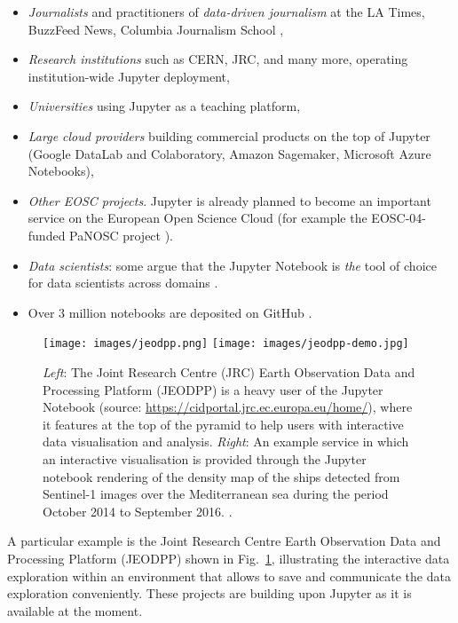 \begin{itemize}
\item \emph{Journalists} and practitioners of \emph{data-driven
    journalism} at the LA Times, BuzzFeed News, Columbia Journalism School \cite{latimes-datadesk} \cite{columbia-nytimes} \cite{data-journalism},
\item \emph{Research institutions} such as CERN, JRC, and many more,
  operating institution-wide Jupyter deployment,
\item \emph{Universities} using Jupyter as a teaching platform,
\item \emph{Large cloud providers} building commercial products on the
  top of Jupyter (Google DataLab and Colaboratory, Amazon Sagemaker, Microsoft Azure
  Notebooks),
\item \emph{Other EOSC projects}. Jupyter is already planned to become
  an important service on the European Open Science Cloud (for example
  the EOSC-04-funded PaNOSC project \cite{panosc}).
\item \emph{Data scientists}: some argue that the Jupyter Notebook is
  \emph{the} tool of choice for data scientists across domains
  \cite{Perkel2018}.
\item Over 3 million notebooks are deposited on GitHub \cite{notebookcount}.
\end{itemize}
%
\begin{figure}[tb]
  \centering\texttt{[image: images/jeodpp.png]}
  \centering\texttt{[image: images/jeodpp-demo.jpg]}
  \caption{\emph{Left}: The Joint Research Centre (JRC) Earth Observation
    Data and Processing Platform (JEODPP) is a heavy user of the
    Jupyter Notebook (source:
    \url{https://cidportal.jrc.ec.europa.eu/home/}), where it features
    at the top of the pyramid to help users with interactive data
    visualisation and analysis. \emph{Right}: An example
    service in which an interactive visualisation is provided through
    the Jupyter notebook rendering of the density map of the ships
    detected from Sentinel-1 images over the Mediterranean sea during
    the period October 2014 to September 2016. \cite[Figure
    6]{Soille2018}. \label{fig:jeodpp}}
\end{figure}
%
A particular example is the Joint Research Centre Earth Observation
Data and Processing Platform (JEODPP) shown in Fig.~\ref{fig:jeodpp},
illustrating the interactive data exploration within an environment
that allows to save and communicate the data exploration
conveniently. These projects are building upon Jupyter as it is
available at the moment.
\bigskip

